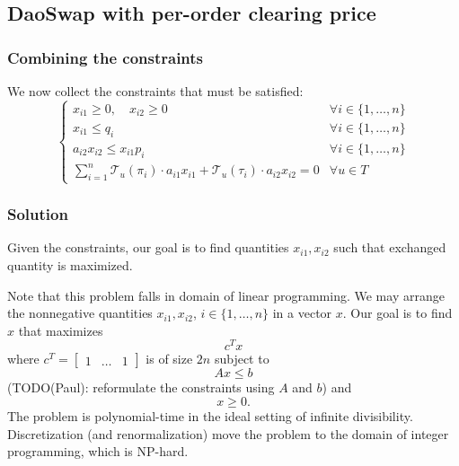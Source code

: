 \documentclass[11pt, reqno]{amsart}
\theoremstyle{definition}
\theoremstyle{remark}
\begin{document}
\subsection{DaoSwap with per-order clearing price}

\subsubsection{Combining the constraints}

We now collect the constraints that must be satisfied:
\begin{equation}
	\begin{cases}
        x_{i1} \geq 0, \quad x_{i2} \geq 0 & \forall i \in \{1, \ldots, n\} \\
        x_{i1} \leq q_i & \forall i \in \{1, \ldots, n\} \\
        a_{i2} x_{i2} \leq x_{i1} p_i & \forall i \in \{1, \ldots, n\} \\
        \sum_{i=1}^n \mathcal{T}_u(\pi_i) \cdot a_{i1} x_{i1}
        + \mathcal{T}_u(\tau_i) \cdot a_{i2} x_{i2}
        = 0 & \forall u \in T
	\end{cases}
\end{equation}

\subsubsection{Solution}
Given the constraints, our goal is to find quantities $x_{i1}, x_{i2}$ such
that exchanged quantity is maximized.

Note that this problem falls in domain of linear programming. We may arrange
the nonnegative quantities $x_{i1}, x_{i2}$, $i \in \{1, \ldots, n\}$ in a
vector $x$. Our goal is to find $x$ that maximizes
\[
    c^T x
\]
where $c^T = \begin{bmatrix}1 & \ldots & 1 \end{bmatrix}$ is of size $2n$
subject to
\[
    A x \leq b
\]
(TODO(Paul): reformulate the constraints using $A$ and $b$)
and
\[
    x \geq 0.
\]
The problem is polynomial-time in the ideal setting of infinite divisibility.
Discretization (and renormalization) move the problem to the domain of
integer programming, which is NP-hard.
\end{document}
